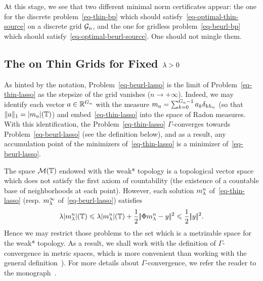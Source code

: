  \begin{rem}
   At this stage, we see that two different minimal norm certificates appear: the one for the discrete problem~\eqref{eq-thin-bp} which should satisfy~\eqref{eq-optimal-thin-source} on a discrete grid $\mathcal{G}_n$, and the one for gridless problem~\eqref{eq-beurl-bp} which should satisfy~\eqref{eq-optimal-beurl-source}. One should not mingle them.
 \end{rem}


\subsection{The \lasso on Thin Grids for Fixed $\lambda>0$}

As hinted by the notation, Problem~\eqref{eq-beurl-lasso} is the limit of Problem~\eqref{eq-thin-lasso} as the stepsize of the grid vanishes (\ie $n\to+\infty$).
Indeed, we may identify each vector $a\in\mathbb{R}^{{G_n}}$ with the measure $m_a= \sum_{k=0}^{{G_n}-1} a_k\delta_{k{h_n}}$ (so that $\|a\|_1=|m_a|(\mathbb{T})$) and embed~\eqref{eq-thin-lasso} into the space of Radon measures. With this identification, the Problem~\eqref{eq-thin-lasso} $\Gamma$-converges towards Problem~\eqref{eq-beurl-lasso} (see the definition below), and as a result, any accumulation point of the minimizers of~\eqref{eq-thin-lasso} is a minimizer of~\eqref{eq-beurl-lasso}.

\begin{rem}
  The space $\mathcal{M}(\mathbb{T})$ endowed with the weak* topology is a topological vector space which does not satisfy the first axiom of countability (\ie the existence of a countable base of neighborhoods at each point). However, each solution $m^n_\lambda$ of~\eqref{eq-thin-lasso} (resp. $m^\infty_\lambda$ of~\eqref{eq-beurl-lasso}) satisfies 
  \begin{align}
\lambda |m^n_\lambda|(\mathbb{T})\leqslant \lambda |m^n_\lambda|(\mathbb{T})+\frac{1}{2}|\!| \Phi m^n_\lambda-y |\!|^2 \leqslant \frac{1}{2}|\!| y |\!|^2.
\label{eq-X-bounded}
  \end{align}
  Hence we may restrict those problems to the set
	which is a metrizable space for the weak* topology. As a result, we shall work with the definition of $\Gamma$-convergence in metric spaces, which is more convenient than working with the general definition~\cite[Definition~4.1]{Dalmaso1993}). For more details about $\Gamma$-convergence, we refer the reader to the monograph~\cite{Dalmaso1993}.
\end{rem}

